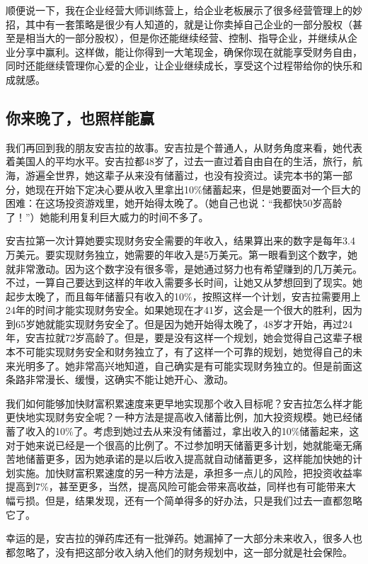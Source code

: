 顺便说一下，我在企业经营大师训练营上，给企业老板展示了很多经营管理上的妙招，其中有一套策略是很少有人知道的，就是让你卖掉自己企业的一部分股权（甚至是相当大的一部分股权），但是你还能继续经营、控制、指导企业，并继续从企业分享中赢利。这样做，能让你得到一大笔现金，确保你现在就能享受财务自由，同时还能继续管理你心爱的企业，让企业继续成长，享受这个过程带给你的快乐和成就感。

\subsection{你来晚了，也照样能赢}

我们再回到我的朋友安吉拉的故事。安吉拉是个普通人，从财务角度来看，她代表着美国人的平均水平。安吉拉都48岁了，过去一直过着自由自在的生活，旅行，航海，游遍全世界，她这辈子从来没有储蓄过，也没有投资过。读完本书的第一部分，她现在开始下定决心要从收入里拿出10\%储蓄起来，但是她要面对一个巨大的困难：在这场投资游戏里，她开始得太晚了。（她自己也说：“我都快50岁高龄了！”）她能利用复利巨大威力的时间不多了。

安吉拉第一次计算她要实现财务安全需要的年收入，结果算出来的数字是每年3.4万美元。要实现财务独立，她需要的年收入是5万美元。第一眼看到这个数字，她就非常激动。因为这个数字没有很多零，是她通过努力也有希望赚到的几万美元。不过，一算自己要达到这样的年收入需要多长时间，让她又从梦想回到了现实。她起步太晚了，而且每年储蓄只有收入的10\%，按照这样一个计划，安吉拉需要用上24年的时间才能实现财务安全。如果她现在才41岁，这会是一个很大的胜利，因为到65岁她就能实现财务安全了。但是因为她开始得太晚了，48岁才开始，再过24年，安吉拉就72岁高龄了。但是，要是没有这样一个规划，她会觉得自己这辈子根本不可能实现财务安全和财务独立了，有了这样一个可靠的规划，她觉得自己的未来光明多了。她非常高兴地知道，自己确实是有可能实现财务独立的。但是前面这条路非常漫长、缓慢，这确实不能让她开心、激动。

我们如何能够加快财富积累速度来更早地实现那个收入目标呢？安吉拉怎么样才能更快地实现财务安全呢？一种方法是提高收入储蓄比例，加大投资规模。她已经储蓄了收入的10\%了。考虑到她过去从来没有储蓄过，拿出收入的10\%储蓄起来，这对于她来说已经是一个很高的比例了。不过参加明天储蓄更多计划，她就能毫无痛苦地储蓄更多，因为她承诺的是以后收入提高就自动储蓄更多，这样能加快她的计划实施。加快财富积累速度的另一种方法是，承担多一点儿的风险，把投资收益率提高到7\%，甚至更多，当然，提高风险可能会带来高收益，同样也有可能带来大幅亏损。但是，结果发现，还有一个简单得多的好办法，只是我们过去一直都忽略它了。

幸运的是，安吉拉的弹药库还有一批弹药。她漏掉了一大部分未来收入，很多人也都忽略了，没有把这部分收入纳入他们的财务规划中，这一部分就是社会保险。

